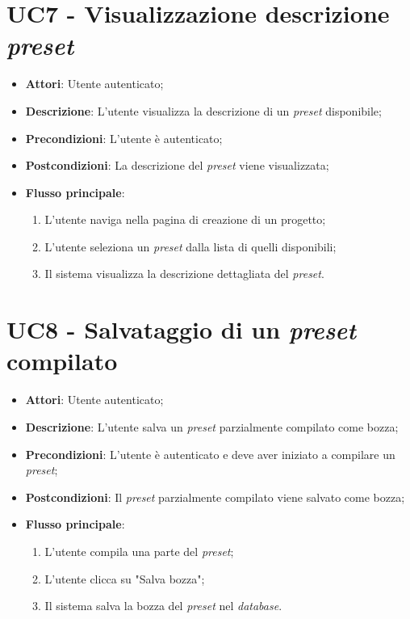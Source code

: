 \section*{UC7 - Visualizzazione descrizione \textit{preset}}
\begin{itemize}
    \item \textbf{Attori}: Utente autenticato;
    \item \textbf{Descrizione}: L'utente visualizza la descrizione di un \textit{preset} disponibile;
    \item \textbf{Precondizioni}: L'utente è autenticato;
    \item \textbf{Postcondizioni}: La descrizione del \textit{preset} viene visualizzata;
    \item \textbf{Flusso principale}:
    \begin{enumerate}
        \item L’utente naviga nella pagina di creazione di un progetto;
        \item L'utente seleziona un \textit{preset} dalla lista di quelli disponibili;
        \item Il sistema visualizza la descrizione dettagliata del \textit{preset}.
    \end{enumerate}
\end{itemize}

\vspace{0.5cm}  
\section*{UC8 - Salvataggio di un \textit{preset} compilato}
\begin{itemize}
    \item \textbf{Attori}: Utente autenticato;
    \item \textbf{Descrizione}: L'utente salva un \textit{preset} parzialmente compilato come bozza;
    \item \textbf{Precondizioni}: L'utente è autenticato e deve aver iniziato a compilare un \textit{preset};
    \item \textbf{Postcondizioni}: Il \textit{preset} parzialmente compilato viene salvato come bozza;
    \item \textbf{Flusso principale}:
    \begin{enumerate}
        \item L'utente compila una parte del \textit{preset};
        \item L'utente clicca su "Salva bozza";
        \item Il sistema salva la bozza del \textit{preset} nel \textit{database}.
    \end{enumerate}
\end{itemize}

